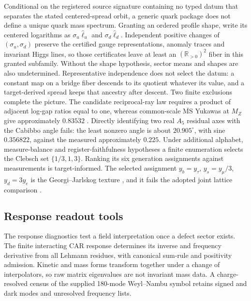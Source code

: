 \documentclass[11pt]{article}
\begin{document}
Conditional on the registered source signature containing no typed datum
that separates the stated centered-spread orbit, a generic quark package
does not define a unique quark mass spectrum. Granting an ordered profile
shape, write its centered logarithms as \(\sigma_u\widehat\ell_u\) and
\(\sigma_d\widehat\ell_d\). Independent positive changes of
\((\sigma_u,\sigma_d)\) preserve the certified gauge representations,
anomaly traces and invariant Higgs lines, so those certificates leave at
least an \((\mathbb R_{>0})^2\) fiber in this granted subfamily.
Without the shape hypothesis, sector means and shapes are also undetermined.
Representative independence does not select the datum: a constant map on a
bridge fiber descends to its quotient whatever its value, and a
target-derived spread keeps that ancestry after descent. Two finite
exclusions complete the picture. The candidate reciprocal-ray law requires a
product of adjacent log-gap ratios equal to one, whereas common-scale
\(\overline{\mathrm{MS}}\) Yukawas at \(M_Z\) give approximately \(0.83532\)
\cite{antusch2025running}. Directly identifying two real \(A_5\) residual
axes with the Cabibbo angle fails: the least nonzero angle is about
\(20.905^\circ\), with sine \(0.356822\), against the measured approximately
\(0.225\). Under additional alphabet, measure-balance and
register-faithfulness hypotheses a finite enumeration selects the Clebsch
set \(\{1/3,1,3\}\). Ranking its six generation assignments against
measurements is target-informed. The selected assignment
\(y_b=y_\tau\), \(y_s=y_\mu/3\), \(y_d=3y_e\) is the Georgi--Jarlskog texture
\cite{pwgeorgi1979new}, and it fails the adopted joint lattice comparison
\cite{flag2024}.

\subsection{Response readout tools}

The response diagnostics test a field interpretation once a defect sector
exists. The finite interacting CAR response determines its inverse and
frequency derivative from all Lehmann residues, with canonical sum-rule and
positivity admission. Kinetic and mass forms transform together under a
change of interpolators, so raw matrix eigenvalues are not invariant mass
data. A charge-resolved census of the supplied 180-mode Weyl--Nambu symbol
retains signed and dark modes and unresolved frequency lists.
\end{document}
